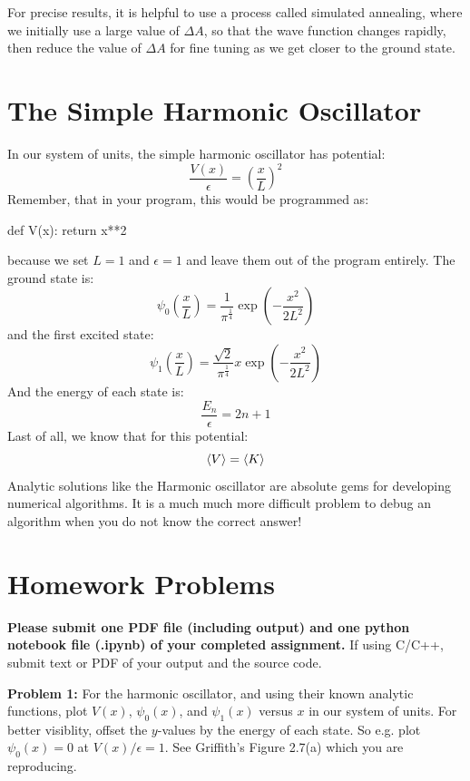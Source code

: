 \documentclass[12pt]{article}
\begin{document}
For precise results, it is helpful to use a process called simulated
annealing, where we initially use a large value of $\Delta A$, so that
the wave function changes rapidly, then reduce the value of $\Delta A$
for fine tuning as we get closer to the ground state.

\section{The Simple Harmonic Oscillator}

In our system of units, the simple harmonic oscillator has potential:
$$\frac{V(x)}{\epsilon} = \left(\frac{x}{L}\right)^2$$
Remember, that in your program, this would be programmed as:
\begin{python}
def V(x):
  return x**2
\end{python}
because we set $L=1$ and $\epsilon=1$ and leave them out of the
program entirely.  The ground state is:
$$\psi_0 \left( \frac{x}{L} \right) = \frac{1}{\pi^\frac{1}{4}}
\exp\left( -\frac{x^2}{2 L^2} \right)$$
and the first excited state:
$$\psi_1 \left( \frac{x}{L} \right) = \frac{\sqrt{2}}{\pi^\frac{1}{4}} x \exp\left( -\frac{x^2}{2 L^2} \right) $$
And the energy of each state is:
$$\frac{E_n}{\epsilon} = 2 n + 1$$
Last of all, we know that for this potential:
$$\braket{V} = \braket{K}$$
Analytic solutions like the Harmonic oscillator are absolute gems for
developing numerical algorithms.  It is a much much more difficult problem
to debug an algorithm when you do not know the correct answer!

\section{Homework Problems}

\noindent
{\bf Please submit one PDF file (including output) and one python
  notebook file (.ipynb) of your completed assignment.}  If using
C/C++, submit text or PDF of your output and the source code.

\noindent
{\bf Problem 1:} For the harmonic oscillator, and using their known
analytic functions, plot $V(x)$, $\psi_0(x)$, and $\psi_1(x)$ versus
$x$ in our system of units. For better visiblity, offset the
$y$-values by the energy of each state.  So e.g. plot $\psi_0(x)=0$ at
$V(x)/\epsilon=1$.  See Griffith's Figure 2.7(a) which you are
reproducing.\\[3pt]
\end{document}
